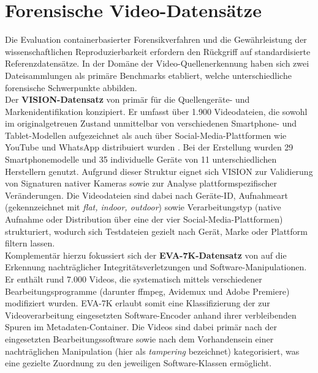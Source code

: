 \newpage
\section{Forensische Video-Datensätze}

Die Evaluation containerbasierter Forensikverfahren und die Gewährleistung der wissenschaftlichen Reproduzierbarkeit erfordern den Rückgriff auf standardisierte Referenzdatensätze. In der Domäne der Video-Quellenerkennung haben sich zwei Dateisammlungen als primäre Benchmarks etabliert, welche unterschiedliche forensische Schwerpunkte abbilden.\\

Der \textbf{VISION-Datensatz} von \citeauthor{shullani_vision_2017} primär für die Quellengeräte- und Markenidentifikation konzipiert. Er umfasst über 1.900 Videodateien, die sowohl im originalgetreuen Zustand unmittelbar von verschiedenen Smartphone- und Tablet-Modellen aufgezeichnet als auch über Social-Media-Plattformen wie YouTube und WhatsApp distribuiert wurden \cite[Kap. 1]{shullani_vision_2017}. Bei der Erstellung wurden 29 Smartphonemodelle und 35 individuelle Geräte von 11 unterschiedlichen Herstellern genutzt. Aufgrund dieser Struktur eignet sich VISION zur Validierung von Signaturen nativer Kameras sowie zur Analyse plattformspezifischer Veränderungen. Die Videodateien sind dabei nach Geräte-ID, Aufnahmeart (gekennzeichnet mit \textit{flat, indoor, outdoor}) sowie Verarbeitungstyp (native Aufnahme oder Distribution über eine der vier Social-Media-Plattformen) strukturiert, wodurch sich Testdateien gezielt nach Gerät, Marke oder Plattform filtern lassen. \cite{shullani_vision_2017}\\

Komplementär hierzu fokussiert sich der \textbf{EVA-7K-Datensatz} von \citeauthor{yang_efficient_2020} auf die Erkennung nachträglicher Integritätsverletzungen und Software-Manipulationen. Er enthält rund 7.000 Videos, die systematisch mittels verschiedener Bearbeitungsprogramme (darunter ffmpeg, Avidemux und Adobe Premiere) modifiziert wurden. EVA-7K erlaubt somit eine Klassifizierung der zur Videoverarbeitung eingesetzten Software-Encoder anhand ihrer verbleibenden Spuren im Metadaten-Container. Die Videos sind dabei primär nach der eingesetzten Bearbeitungssoftware sowie nach dem Vorhandensein einer nachträglichen Manipulation (hier als \textit{tampering} bezeichnet) kategorisiert, was eine gezielte Zuordnung zu den jeweiligen Software-Klassen ermöglicht. \cite{yang_efficient_2020}\\

